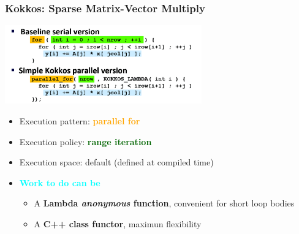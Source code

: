 \begin{frame}
  \frametitle{Kokkos: Sparse Matrix-Vector Multiply}

  \begin{center}
    \includegraphics[width=8.5cm]{doc/perf_portability/kokkos_spmv}
  \end{center}

  \begin{itemize}
  \item Execution pattern: \textcolor{orange}{\textbf{parallel for}}
  \item Execution policy: \textcolor{darkgreen}{\textbf{range iteration}}
  \item Execution space: default (defined at compiled time)
  \item \textcolor{cyan}{\textbf{Work to do can be}}
    \begin{itemize}
    \item A \textbf{Lambda \textit{anonymous} function}, convenient for short loop bodies
    \item A \textbf{C++ class functor}, maximun flexibility
    \end{itemize}
  \end{itemize}
\end{frame}




